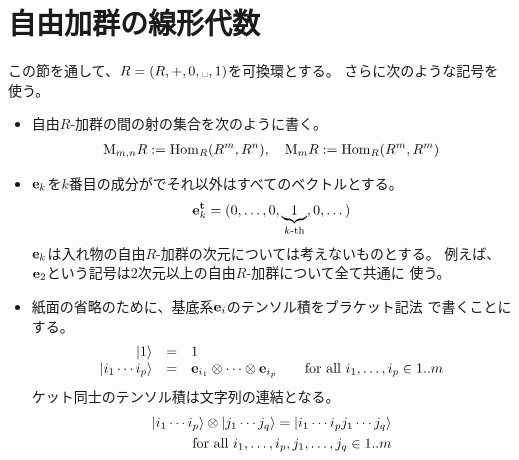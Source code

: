 {\section{自由加群の線形代数}\label{s1:自由加群の線形代数} %
	この節を通して、$R=(R,+,0,\myspace,1)$を可換環とする。
	さらに次のような記号を使う。
	\begin{itemize}\setlength{\itemsep}{-1mm} %
		\item 自由$R$-加群の間の射の集合を次のように書く。
		\begin{equation*}\begin{split}
			{\ensuremath{\operatorname{M}}}_{m,n}R := {\operatorname{Hom}}_R(R^m,R^n) ,\quad {\ensuremath{\operatorname{M}}}_{m}R := {\operatorname{Hom}}_R(R^m,R^m)
		\end{split}\end{equation*}
		\item ${\mathbf{e}}_k$を$k$番目の成分がでそれ以外はすべてのベクトルとする。
		\begin{equation*}\begin{split}
			{\mathbf{e}}_k^{\mathbf{t}} = (0,\dots,0,\underbrace{1}_{\text{$k$-th}},0,\dots)
		\end{split}\end{equation*}
		${\mathbf{e}}_k$は入れ物の自由$R$-加群の次元については考えないものとする。
		例えば、${\mathbf{e}}_2$という記号は$2$次元以上の自由$R$-加群について全て共通に
		使う。
		\item 紙面の省略のために、基底系${\mathbf{e}}_i$のテンソル積をブラケット記法
		で書くことにする。
		\begin{equation*}\begin{array}{rcll}
			\mathinner{|{1}\rangle} &=& 1 \\
			\mathinner{|{i_1\cdots i_p}\rangle} &=& {\mathbf{e}}_{i_1}\otimes\cdots\otimes {\mathbf{e}}_{i_p} 
				& \quad\text{for all } i_1,\dots,i_p\in 1..m \\
		\end{array}\end{equation*}
		ケット同士のテンソル積は文字列の連結となる。
		\begin{equation*}\begin{split}
			\mathinner{|{i_1\cdots i_p}\rangle}\otimes\mathinner{|{j_1\cdots j_q}\rangle}
				= \mathinner{|{i_1\cdots i_pj_1\cdots j_q}\rangle} \\
			\quad\text{for all } i_1,\dots,i_p,j_1,\dots,j_q\in 1..m \\
		\end{split}\end{equation*}
	\end{itemize} %
}
